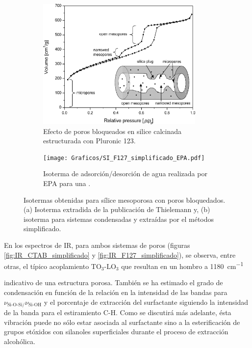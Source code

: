 {			%
			\begin{figure}[th]
		 	   	    \begin{subfigure}[t]{0.49\textwidth}
			       	\includegraphics[width=0.90\textwidth]{Graficos/Doble-distr.png}
			       	\caption{Efecto de poros bloqueados en silice calcinada estructurada con Pluronic 123.}
			       	\label{fig:thielemann}
			   		\end{subfigure}
			   		\begin{subfigure}[t]{0.49\textwidth}
			   	    \texttt{[image: Graficos/SI\_F127\_simplificado\_EPA.pdf]}
			   	    \caption{Isoterma de adsorción/desorción de agua realizada por EPA para una \pdmF.}
			   		\end{subfigure}
					 \caption[Microscopías \pdmF\space tratamiento simplificado.]{Isotermas obtenidas para sílice mesoporosa con poros bloquedados. (a) Isoterma extradida de la publicación de Thielemann\cite{Thielemann2011} y, (b) isoterma para sistemas \pdmF\space condensadas y extraídas por el métodos simplificado.}
					 \label{fig:F127_simplificado_EPA_2}	
				     \end{figure}

			 \pagebreak En los espectros de IR, para ambos sistemas de poros (figuras \ref{fig:IR_CTAB_simplificado} y \ref{fig:IR_F127_simplificado}), se observa, entre otras, el típico acoplamiento TO$_3$-LO$_3$ que resultan en un hombro a \SI{1180}{\cm^{-1}}} indicativo de una estructura porosa\cite{Innocenzi2003}. También se ha estimado el grado de condensación en función de la relación en la intensidad de las bandas para $\nu_{\text{Si-O-Si/}}\nu_{\text{Si-OH}}$ y el porcentaje de extracción del surfactante siguiendo la intensidad de la banda para el estiramiento C-H. Como se discutirá más adelante, ésta vibración puede no sólo estar asociada al surfactante sino a la esterificación de grupos etóxidos con silanoles superficiales durante el proceso de extracción alcohólica.

